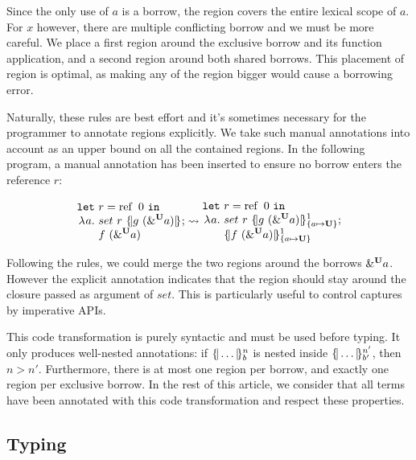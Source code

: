 Since the only use of $a$ is a borrow,
the region covers the entire lexical scope of $a$. For $x$ however, there are
multiple conflicting borrow and we must be more careful. We place a first
region around the exclusive borrow and its function application,
and a second region around both shared borrows. This placement of region
is optimal, as making any of the region bigger would cause a borrowing
error.

Naturally, these rules are best effort and it's sometimes necessary for the
programmer to annotate regions explicitly. We take such manual annotations
into account as an upper bound on all the contained regions.
In the following program, a manual annotation has been inserted to ensure
no borrow enters the reference $r$:

\[
  \setlength{\jot}{-1pt}
  \RannotT{
\begin{aligned}
  \letin{&r}{\operatorname{ref}\ 0}{}\\
  \lam{a}{}\ &
  set\ r\ \region[]{}{g\ (\borrow[\kun]{a})};\\
  &f\ (\borrow[\kun]{a}) 
\end{aligned}
}{
\begin{aligned}
  \letin{&r}{\operatorname{ref}\ 0}{}\\
  \lam{a}{}\ &
  set\ r\ \region[1]{\Sone a\IBORROW}{g\ (\borrow[\kun]{a})};\\
  &\region[1]{\Sone a\IBORROW}{f\ (\borrow[\kun]{a})}
\end{aligned}
}
\]

Following the rules, we could merge the two regions around the borrows
$\borrow[\kun]{a}$. However
the explicit annotation indicates that the region should stay around the closure
passed as argument of $set$. This is particularly useful to control captures
by imperative APIs.

This code transformation is purely syntactic and must be used before
typing. It only produces well-nested annotations: if $\region[n]{b}{\dots}$
is nested inside $\region[n']{b'}{\dots}$, then $n > n'$. Furthermore, there
is at most one region per borrow, and exactly one region per exclusive borrow.
In the rest of this article, we consider
that all terms have been annotated with this code transformation and respect
these properties.

\subsection{Typing}
\label{sdtyping}


